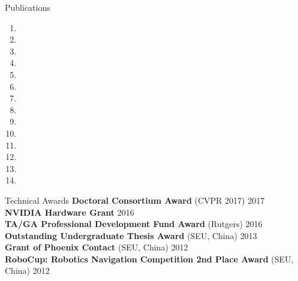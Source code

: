 \documentclass{resume} %
\begin{document}

%
\begin{rSection}{Publications}
\begin{enumerate}

\item {}

\item {}

\item {}

\item {}

\item {}

\item{}

\item {}

\item {}

\item{}

\item {}

\item {}

\item {}


\item {}

\item {}

\end{enumerate}
\end{rSection}



\begin{rSection}{Technical Awards}
{\bf Doctoral Consortium Award} (CVPR 2017) \hfill {2017} \\
{\bf NVIDIA Hardware Grant} \hfill{2016} \\
{\bf TA/GA Professional Development Fund Award} (Rutgers) \hfill {2016}\\ 
{\bf Outstanding Undergraduate Thesis Award} (SEU, China) \hfill {2013}\\
{\bf Grant of Phoenix Contact} (SEU, China) \hfill {2012} \\
{\bf RoboCup: Robotics Navigation Competition 2nd Place Award} (SEU, China) \hfill {2012}

\end{rSection}
\end{document}
